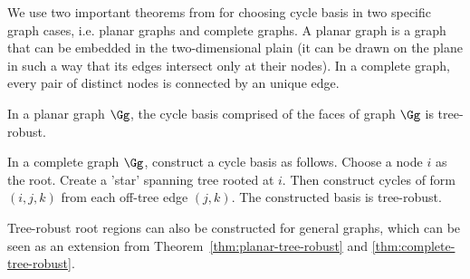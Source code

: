 
We use two important theorems from \cite{gelfand2012generalized} for choosing cycle basis in two specific graph cases, i.e. planar graphs and complete graphs. A planar graph is a graph that can be embedded in the two-dimensional plain (it can be drawn on the plane in such a way that its edges intersect only at their nodes). In a complete graph, every pair of distinct nodes is connected by an unique edge.

\begin{theorem}\label{thm:planar-tree-robust}
  In a planar graph $\Gg$, the cycle basis comprised of the faces of graph $\Gg$ is tree-robust.
\end{theorem}

\begin{theorem}\label{thm:complete-tree-robust}
  In a complete graph $\Gg$, construct a cycle basis as follows. Choose a node $i$ as the root. Create a 'star' spanning tree rooted at $i$. Then construct cycles of form $(i,j,k)$ from each off-tree edge $(j,k)$. The constructed basis is tree-robust.
\end{theorem}

Tree-robust root regions can also be constructed for general graphs, which can be seen as an extension from Theorem~\ref{thm:planar-tree-robust} and \ref{thm:complete-tree-robust}.

